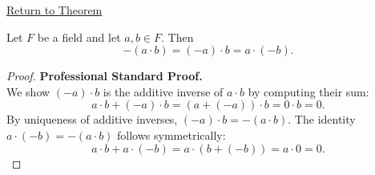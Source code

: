 \newpage
{}
\label{prf:negation-of-product}

\begin{remark*}[Return]
\hyperref[thm:negation-of-product]{Return to Theorem}
\end{remark*}

\begin{theorem*}
Let $F$ be a field and let $a,b\in F$.  Then
\[
-(a\cdot b) = (-a)\cdot b = a\cdot(-b).
\]
\end{theorem*}

\begin{proof}
\textbf{Professional Standard Proof.}~\\
We show $(-a)\cdot b$ is the additive inverse of $a\cdot b$ by computing
their sum:
\[
a\cdot b + (-a)\cdot b = (a + (-a))\cdot b = 0\cdot b = 0.
\]
By uniqueness of additive inverses, $(-a)\cdot b = -(a\cdot b)$.
The identity $a\cdot(-b) = -(a\cdot b)$ follows symmetrically:
\[
a\cdot b + a\cdot(-b) = a\cdot(b + (-b)) = a\cdot 0 = 0.
\]
\end{proof}

